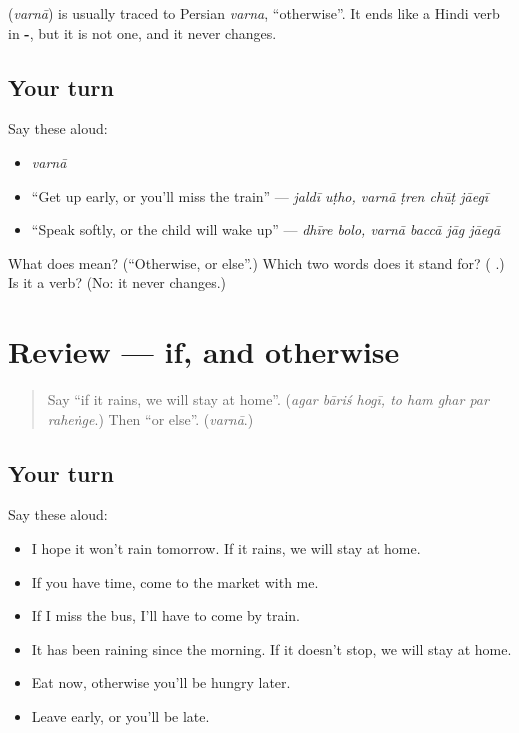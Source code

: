 \begin{cousinweb}
\textbf{} (\emph{varnā}) is usually traced to Persian \emph{varna}, \textquotedblleft{}otherwise\textquotedblright{}. It ends like a Hindi verb in \textbf{-}, but it is not one, and it never changes.
\end{cousinweb}

\subsection*{Your turn}
Say these aloud:

\begin{itemize}
\raggedright
  \item \emph{varnā}
  \item \textquotedblleft{}Get up early, or you'll miss the train\textquotedblright{} — \emph{jaldī uṭho, varnā ṭren chūṭ jāegī}
  \item \textquotedblleft{}Speak softly, or the child will wake up\textquotedblright{} — \emph{dhīre bolo, varnā baccā jāg jāegā}
\end{itemize}

\begin{tcolorbox}[breakable,colback=teal!4,colframe=teal!35!black,title={Before you move on}]
What does \textbf{} mean? (\textquotedblleft{}Otherwise, or else\textquotedblright{}.) Which two words does it stand for? (\textbf{ }.) Is it a verb? (No: it never changes.)
\end{tcolorbox}
\section[(review)]{Review — if, and otherwise}

\label{lesson:HI-R286-if-and-otherwise}



\begin{quote}
Say \textquotedblleft{}if it rains, we will stay at home\textquotedblright{}. (\emph{agar bāriś hogī, to ham ghar par raheṅge}.) Then \textquotedblleft{}or else\textquotedblright{}. (\emph{varnā}.)
\end{quote}

\subsection*{Your turn}
Say these aloud:

\begin{itemize}
\raggedright
  \item I hope it won't rain tomorrow. If it rains, we will stay at home.
  \item If you have time, come to the market with me.
  \item If I miss the bus, I'll have to come by train.
  \item It has been raining since the morning. If it doesn't stop, we will stay at home.
  \item Eat now, otherwise you'll be hungry later.
  \item Leave early, or you'll be late.
\end{itemize}

